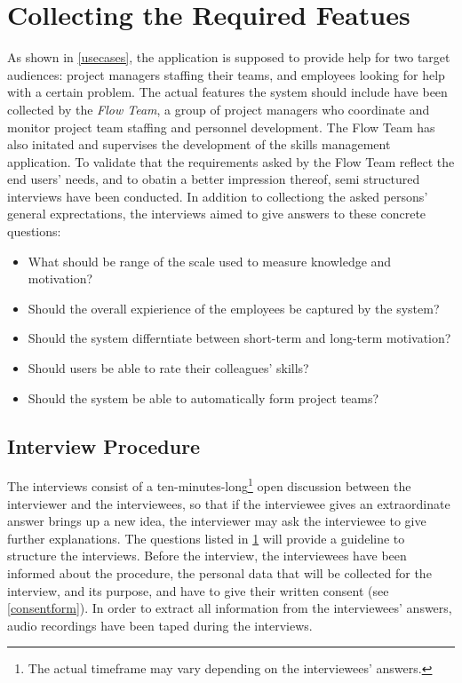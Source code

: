 \section{Collecting the Required Featues}
\label{interviewquestions}
As shown in \ref{usecases}, the application is supposed to provide help for two target audiences: project managers staffing their teams, and employees looking for help with a certain problem.
The actual features the system should include have been collected by the \textit{Flow Team}, a group of project managers who coordinate and monitor project team staffing and personnel development. The Flow Team has also initated and supervises the development of the skills management application. To validate that the requirements asked by the Flow Team reflect the end users' needs, and to obatin a better impression thereof, semi structured interviews have been conducted. In addition to collectiong the asked persons' general exprectations, the interviews aimed to give answers to these concrete questions:
\begin{itemize}
	\item What should be range of the scale used to measure knowledge and motivation?
	\item Should the overall expierience of the employees be captured by the system?
	\item Should the system differntiate between short-term and long-term motivation?
	\item Should users be able to rate their colleagues' skills?
	\item Should the system be able to automatically form project teams?
\end{itemize}

\subsection{Interview Procedure}
The interviews consist of a ten-minutes-long\footnote{The actual timeframe may vary depending on the interviewees' answers.} open discussion between the interviewer and the interviewees, so that if the interviewee gives an extraordinate answer brings up a new idea, the interviewer may ask the interviewee to give further explanations. The questions listed in \ref{interviewquestions} will provide a guideline to structure the interviews. Before the interview, the interviewees have been informed about the procedure, the personal data that will be collected for the interview, and its purpose, and have to give their written consent (see \ref{consentform}).
In order to extract all information from the interviewees' answers, audio recordings have been taped during the interviews.

